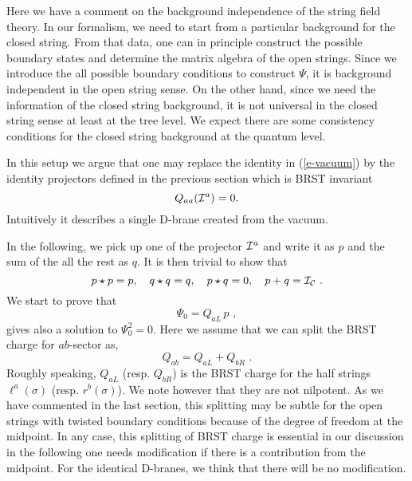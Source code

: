 \documentclass[a4paper,12pt]{article}
\begin{document}
Here we have a comment on the background independence of the string
field theory. In our formalism, we need to start from a particular
background for the closed string. From that data,  one can in principle
construct the possible boundary states and determine the matrix
algebra of the open strings.  Since we introduce the all possible
boundary conditions to construct $\Psi$, it is background independent
in the open string sense.  On the other hand, since we need the
information of the closed string background, it is not universal
in the closed string sense at least at the tree level.
We expect there are some consistency conditions for the
closed string background at the quantum level.

In this setup we argue that one may replace the identity
in (\ref{e-vacuum}) by the identity projectors defined 
in the previous section which is BRST invariant
\begin{equation}
 Q_{aa}({\cal I}^a)=0.
\end{equation}
Intuitively it describes a single D-brane
created from the vacuum.

In the following, we pick up one of the 
projector ${\cal I}^a$ and write it as
$p$ and the sum of the all the rest as $q$. It is then 
trivial to show that 
\begin{equation}
 p\star p=p, \quad q\star q=q, \quad p\star q=0,
  \quad p+q={\cal I}_{\cal C}\,\,.
\end{equation}
We start to prove that
\begin{equation}\label{e-QLp}
 \Psi_0 = Q_{aL} \, p\,\,,
\end{equation}
gives also a solution to $\Psi_0^2=0$.  
Here we assume that we can 
split the BRST charge for $ab$-sector as,
\begin{equation}
 Q_{ab}=Q_{aL}+Q_{bR}\,\,.
\end{equation}
Roughly speaking, $Q_{aL}$ (resp. $Q_{bR}$) is the BRST charge
for the half strings $\ell^a(\sigma)$ (resp. $r^b(\sigma)$).
We note however that they are not nilpotent.
As we have commented in the last section, this splitting
may be subtle for the open strings with twisted boundary conditions
because of the degree of freedom at the midpoint.
In any case, this splitting of BRST charge is essential
in our discussion in the following one needs modification
if there is a contribution from the midpoint.  For the
identical D-branes, we think that there will be no modification.
\end{document}
